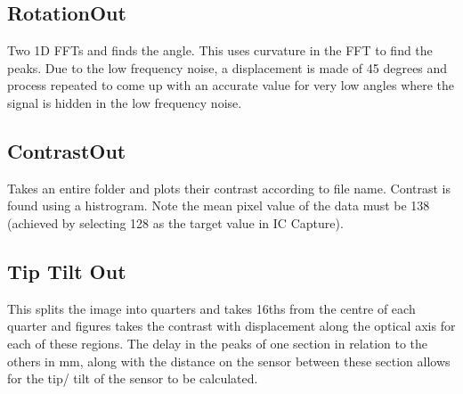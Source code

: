 \documentclass[]{report}
\begin{document}
\subsection*{RotationOut}
Two 1D FFTs and finds the angle. This uses curvature in the FFT to find the peaks. Due to the low frequency noise, a displacement is made of 45 degrees and process repeated to come up with an accurate value for very low angles where the signal is hidden in the low frequency noise.\\

\subsection*{ContrastOut}
Takes an entire folder and plots their contrast according to file name. Contrast is found using a histrogram. Note the mean pixel value of the data must be 138 (achieved by selecting 128 as the target value in IC Capture).

\subsection*{Tip Tilt Out}
This splits the image into quarters and takes 16ths from the centre of each quarter and figures takes the contrast with displacement along the optical axis for each of these regions. The delay in the peaks of one section in relation to the others in mm, along with the distance on the sensor between these section allows for the tip/ tilt of the sensor to be calculated.\\
\end{document}
